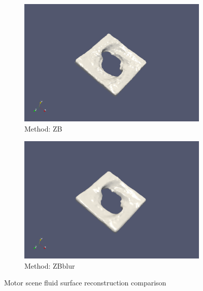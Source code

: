 \begin{figure}[h]
\begin{center}
\begin{subfigure}[b]{0.4\textwidth}
               \includegraphics[width=\textwidth]{figures/ReconstructionMotorSceneZhuBridson.png}
				\caption{Method: ZB}
        \end{subfigure}
        \begin{subfigure}[b]{0.4\textwidth}
               \includegraphics[width=\textwidth]{figures/ReconstructionMotorSceneZhuBridsonBlur.png}
				\caption{Method: ZBblur}
        \end{subfigure}
        \caption{Motor scene fluid surface reconstruction comparison}
        \label{fig:MotorScene}
	\end{center}
\end{figure}



